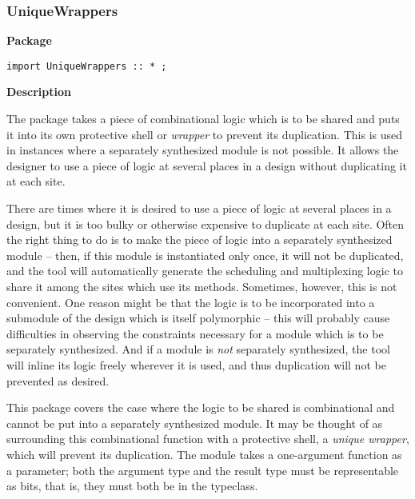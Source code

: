 \subsubsection{UniqueWrappers}

{\bf Package}

\begin{verbatim}
import UniqueWrappers :: * ;
\end{verbatim}


{\bf Description}

The  package takes a piece of combinational logic which is to be
shared and puts it into its own protective shell or  \emph{wrapper} to
prevent  its
duplication.   This is used in instances where a separately synthesized
 module is not possible.   It
 allows the designer to use a piece of logic at several places in a
 design without duplicating it at each site.  

There are times where it is desired to use a piece of logic at several places in a design,
but it is too bulky or otherwise expensive to duplicate at each site.
Often the right thing to do is to make the piece of logic into a
separately synthesized module -- then, if this module is instantiated only
once, it will not be duplicated, and the tool will automatically generate the
scheduling and multiplexing logic to share it among the sites which use its
methods.  Sometimes, however, this is not convenient.  One reason might be
that the logic is to be incorporated into a submodule of the design which is
itself polymorphic -- this will probably cause difficulties in observing the
constraints necessary for a module which is to be separately synthesized.  And
if a module is \emph{not} separately synthesized, the tool will inline its logic
freely wherever it is used, and thus duplication will not be prevented as
desired. 

This package covers the case where the logic to be shared is
combinational and cannot be put into a separately synthesized module.
It may be thought of as surrounding this combinational function with a
protective shell, a \emph{unique wrapper}, which will prevent its duplication.  The
module  takes a one-argument function as a parameter; both the
argument type  and the result type  must be representable
as bits,  that is,
they must both be in the  typeclass.  

